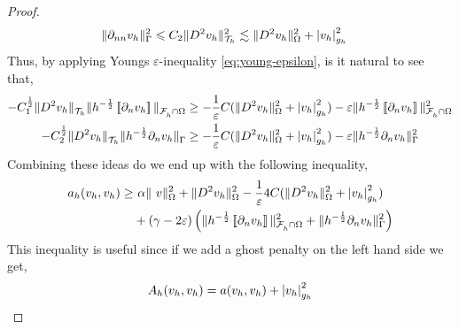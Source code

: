 \begin{proof}
\begin{equation}
\begin{split}
     \|  \partial _{nn}v_{h}  \|_{ \Gamma     }^{ 2 } & \leqslant C_{2} \| D^2 v_{h} \|_{ \mathcal{T} _{h}  }^{2  } \lesssim    \| D^2 v_{h} \|_{ \Omega  }^{ 2 }  + \left\lvert  v_{h}  \right\rvert _{ g_{h} }^{2  }
        \end{split}
    \end{equation}
    Thus, by applying Youngs $\varepsilon $-inequality \eqref{eq:young-epsilon}, is it natural to see that,
    \begin{equation}
        \begin{split}
- C_{1}^{\frac{1}{2}} \| D^2 v_{h}    \|_{ \mathcal{T} _{h}   }^{  }  \|h^{-\frac{1}{2}} \left[\!\left[  \partial _{n} v_{h}  \right]\!\right]   \|_{ \mathcal{F}^{}_{h}\cap \Omega   }^{  }
& \ge - \frac{1}{\varepsilon } C  (\| D^2 v_{h} \|_{ \Omega  }^{ 2 }  + \left\lvert  v_{h}  \right\rvert _{ g_{h} }^{2  } ) -  \varepsilon \|h^{-\frac{1}{2}} \left[\!\left[  \partial _{n} v_{h}  \right]\!\right]   \|_{ \mathcal{F}^{}_{h}\cap \Omega   }^{2  } \\
- C_{2}^{\frac{1}{2}}  \| D^2 v_{h} \|_{ \mathcal{T} _{h} }^{  } \| h^{-\frac{1}{2}}  \partial _{n} v_{h}    \|_{ \Gamma    }^{  }
& \ge - \frac{1}{\varepsilon } C  (\| D^2 v_{h} \|_{ \Omega  }^{ 2 }  + \left\lvert  v_{h}  \right\rvert _{ g_{h} }^{2  } ) -  \varepsilon \|h^{-\frac{1}{2}}  \partial _{n} v_{h}    \|_{ \Gamma    }^{2  } \\
        \end{split}
    \end{equation}
    Combining these ideas do we end up with the following inequality,
    \begin{equation}
    \begin{split}
       a_{h}( v_{h},v_{h})  \ge& \  \alpha     \|\  v  \|_{   \Omega   }^{2} +\| D^2v_{h}  \|_{   \Omega   }^{2} -  \frac{1}{\varepsilon } 4C  (\| D^2 v_{h} \|_{ \Omega  }^{ 2 }  + \left\lvert  v_{h}  \right\rvert _{ g_{h} }^{2  } )  \\
                       & + (\gamma - 2\varepsilon  )\left( \|h^{-\frac{1}{2}}  \left[\!\left[  \partial _{n} v_{h}  \right]\!\right]\|_{\mathcal{F} _{h}^{} \cap \Omega   }^{ 2 } + \| h^{-\frac{1}{2}} \partial _{n} v_{h} \|_{ \Gamma  }^{ 2} \right)        \\
    \end{split}
    \end{equation}
    This inequality is useful since if we add a ghost penalty on the left hand side we get,
    \begin{equation}
        \begin{split}
     A_{h}( v_{h},v_{h}) & = a( v_{h},v_{h}) + \abs{ v_{h} }_{g_{h}}^{2} \\

\end{split}
\end{equation}
\end{proof}
